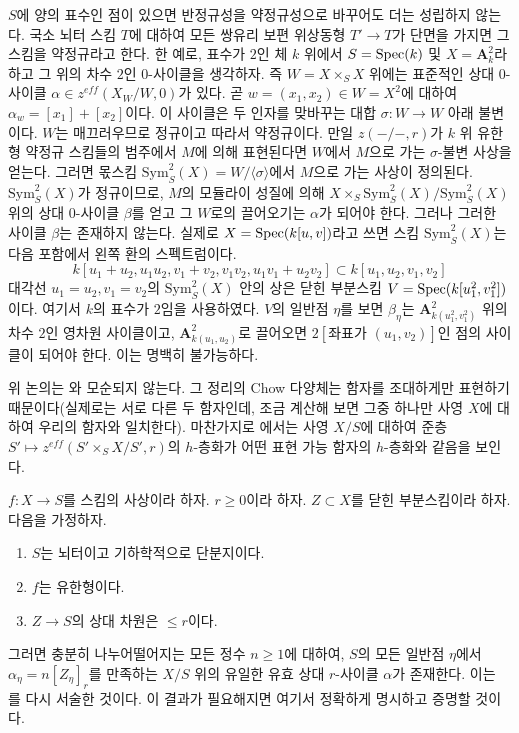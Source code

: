 \begin{remark}
\medskip\noindent
$S$에 양의 표수인 점이 있으면 반정규성을 약정규성으로 바꾸어도 더는
성립하지 않는다. 국소 뇌터 스킴 $T$에 대하여 모든 쌍유리 보편
위상동형 $T' \to T$가 단면을 가지면 그 스킴을 약정규라고 한다. 한 예로,
표수가 $2$인 체 $k$ 위에서 $S = \mathop{\mathrm{Spec}}(k)$ 및
$X = \mathbf{A}^2_k$라 하고 그 위의 차수 $2$인 $0$-사이클을
생각하자. 즉 $W = X \times_S X$ 위에는 표준적인 상대 $0$-사이클
$\alpha \in z^{eff}(X_W/W, 0)$가 있다. 곧
$w = (x_1, x_2) \in W = X^2$에 대하여
$\alpha_w = [x_1] + [x_2]$이다. 이 사이클은 두 인자를 맞바꾸는 대합
$\sigma : W \to W$ 아래 불변이다. $W$는 매끄러우므로 정규이고 따라서
약정규이다. 만일 $z(-/-, r)$가 $k$ 위 유한형 약정규 스킴들의
범주에서 $M$에 의해 표현된다면 $W$에서 $M$으로 가는
$\sigma$-불변 사상을 얻는다. 그러면 몫스킴
$\text{Sym}^2_S(X) = W/\langle \sigma \rangle$에서 $M$으로 가는
사상이 정의된다. $\text{Sym}^2_S(X)$가 정규이므로, $M$의 모듈라이
성질에 의해 $X \times_S \text{Sym}^2_S(X) / \text{Sym}^2_S(X)$ 위의
상대 $0$-사이클 $\beta$를 얻고 그 $W$로의 끌어오기는 $\alpha$가
되어야 한다. 그러나 그러한 사이클 $\beta$는 존재하지 않는다.
실제로 $X = \mathop{\mathrm{Spec}}(k[u, v])$라고 쓰면 스킴 $\text{Sym}^2_S(X)$는
다음 포함에서 왼쪽 환의 스펙트럼이다.
$$
k[u_1 + u_2, u_1u_2, v_1 + v_2, v_1v_2, u_1v_1 + u_2v_2]
\subset
k[u_1, u_2, v_1, v_2]
$$
대각선 $u_1 = u_2, v_1 = v_2$의 $\text{Sym}^2_S(X)$ 안의 상은
닫힌 부분스킴 $V = \mathop{\mathrm{Spec}}(k[u_1^2, v_1^2])$이다. 여기서 $k$의 표수가
$2$임을 사용하였다. $V$의 일반점 $\eta$를 보면 $\beta_\eta$는
$\mathbf{A}^2_{k(u_1^2, v_1^2)}$ 위의 차수 $2$인 영차원 사이클이고,
$\mathbf{A}^2_{k(u_1, u_2)}$로 끌어오면
$2[\text{좌표가 } (u_1, v_2)]$인 점의 사이클이 되어야 한다.
이는 명백히 불가능하다.

\medskip\noindent
위 논의는 \cite[Theorem 4.13]{KRC}와 모순되지 않는다. 그 정리의
Chow 다양체는 함자를 조대하게만 표현하기 때문이다(실제로는 서로
다른 두 함자인데, 조금 계산해 보면 그중 하나만 사영 $X$에 대하여
우리의 함자와 일치한다). 마찬가지로 \cite[Section 4.4]{SV}에서는
사영 $X/S$에 대하여 준층
$S' \mapsto z^{eff}(S' \times_S X/S', r)$의 $h$-층화가 어떤 표현
가능 함자의 $h$-층화와 같음을 보인다.
\end{remark}

\begin{remark}
\label{remark-equidimensional-over-geometrically-unibranch}
$f : X \to S$를 스킴의 사상이라 하자. $r \geq 0$이라 하자.
$Z \subset X$를 닫힌 부분스킴이라 하자. 다음을 가정하자.
\begin{enumerate}
\item $S$는 뇌터이고 기하학적으로 단분지이다.
\item $f$는 유한형이다.
\item $Z \to S$의 상대 차원은 $\leq r$이다.
\end{enumerate}
그러면 충분히 나누어떨어지는 모든 정수 $n \geq 1$에 대하여,
$S$의 모든 일반점 $\eta$에서 $\alpha_\eta = n[Z_\eta]_r$를 만족하는
$X/S$ 위의 유일한 유효 상대 $r$-사이클 $\alpha$가 존재한다.
이는 \cite[Theorem 3.4.2]{SV}를 다시 서술한 것이다. 이 결과가
필요해지면 여기서 정확하게 명시하고 증명할 것이다.
\end{remark}



